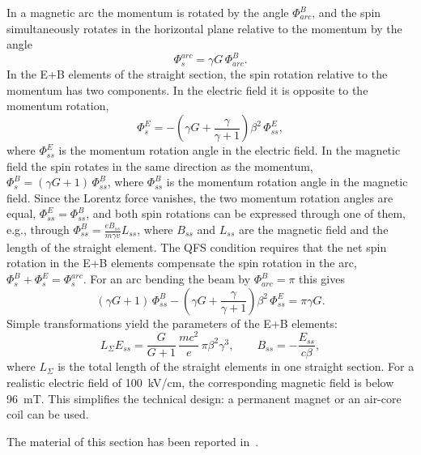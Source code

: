 In a magnetic arc the momentum is rotated by the angle $\Phi^B_{arc}$, and the
spin simultaneously rotates in the horizontal plane relative to the momentum
by the angle
\begin{equation}
  \Phi_s^{arc} = \gamma G\,\Phi^B_{arc} .
  \label{eq:phi_arc}
\end{equation}
In the E+B elements of the straight section, the spin rotation relative to the
momentum has two components. In the electric field it is opposite to the
momentum rotation,
\begin{equation}
  \Phi_s^{E} = -\left(\gamma G+\frac{\gamma}{\gamma+1}\right)\beta^2\,\Phi^{E}_{ss},
  \label{eq:phi_e}
\end{equation}
where $\Phi^E_{ss}$ is the momentum rotation angle in the electric field. In
the magnetic field the spin rotates in the same direction as the momentum,
$\Phi_s^B = (\gamma G+1)\,\Phi^B_{ss}$, where $\Phi^B_{ss}$ is the momentum
rotation angle in the magnetic field. Since the Lorentz force vanishes, the
two momentum rotation angles are equal, $\Phi^E_{ss} = \Phi^B_{ss}$, and both
spin rotations can be expressed through one of them, e.g., through
$\Phi^B_{ss} = \frac{eB_{ss}}{m\gamma v}L_{ss}$, where $B_{ss}$ and $L_{ss}$
are the magnetic field and the length of the straight element. The QFS
condition requires that the net spin rotation in the E+B elements compensate
the spin rotation in the arc, $\Phi_s^B + \Phi_s^E = \Phi_s^{arc}$. For an arc
bending the beam by $\Phi^B_{arc}=\pi$ this gives
\begin{equation}
  (\gamma G+1)\,\Phi^B_{ss} - \left(\gamma G+\frac{\gamma}{\gamma+1}\right)\beta^2\,\Phi^E_{ss} = \pi\gamma G .
  \label{eq:qfs}
\end{equation}
Simple transformations yield the parameters of the E+B elements:
\begin{equation}
  L_\Sigma E_{ss} = \frac{G}{G+1}\,\frac{mc^2}{e}\,\pi\beta^2\gamma^3,
  \qquad
  B_{ss} = -\frac{E_{ss}}{c\beta},
  \label{eq:wien}
\end{equation}
where $L_\Sigma$ is the total length of the straight elements in one straight
section. For a realistic electric field of \SI{100}{kV/cm}, the corresponding
magnetic field is below \SI{96}{mT}. This simplifies the technical design: a
permanent magnet or an air-core coil can be used.

The material of this section has been reported
in~\cite{Senichev:2016rez,Senichev:2024qtr,Melnikov:2025gdj,Melnikov:2025ytd,Senichev:2025jqf}.
